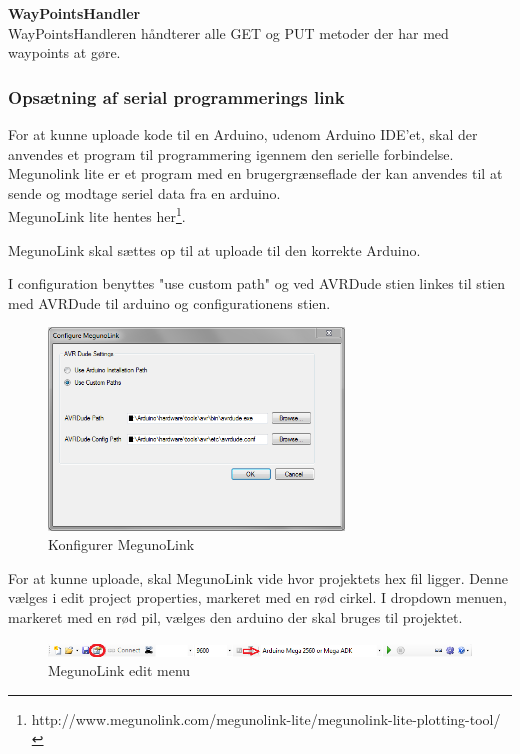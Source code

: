 \textbf{WayPointsHandler}\\
WayPointsHandleren håndterer alle GET og PUT metoder der har med waypoints at gøre. \\ 

\newpage

\subsubsection*{Opsætning af serial programmerings link}

For at kunne uploade kode til en Arduino, udenom Arduino IDE'et, skal der anvendes et program til programmering igennem den serielle forbindelse.
Megunolink lite er et program med en brugergrænseflade der kan anvendes til at sende og modtage seriel data fra en arduino.\\
MegunoLink lite hentes her\footnote{http://www.megunolink.com/megunolink-lite/megunolink-lite-plotting-tool/}.

MegunoLink skal sættes op til at uploade til den korrekte Arduino. 

I configuration benyttes "use custom path" og ved AVRDude stien linkes til stien med AVRDude til arduino og configurationens stien. 

\begin{figure}[H]
	\centering
	\includegraphics[width=0.7\textwidth]{Billeder/implementation/Howtoguide/megunolink_config.png}
	\caption{Konfigurer MegunoLink}
	\label{fig:Konfigurer_MegunoLink}
\end{figure}

For at kunne uploade, skal MegunoLink vide hvor projektets hex fil ligger. Denne vælges i edit project properties, markeret med en rød cirkel.
I dropdown menuen, markeret med en rød pil, vælges den arduino der skal bruges til projektet.

\begin{figure}[H]
	\centering
	\includegraphics[width=1\textwidth]{Billeder/implementation/Howtoguide/meguno_bar.png}
	\caption{MegunoLink edit menu}
	\label{fig:MegunoLink}
\end{figure}






